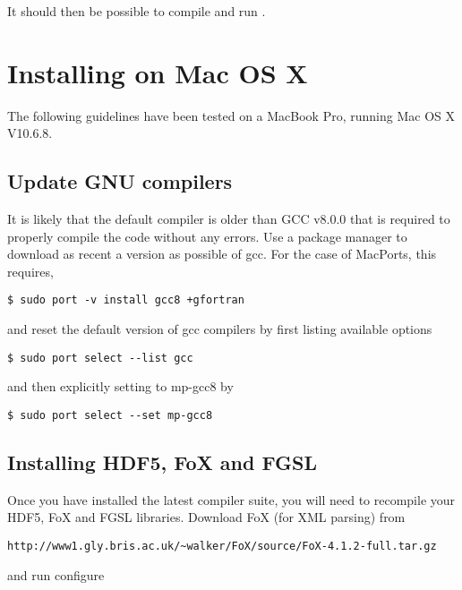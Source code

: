 It should then be possible to compile and run \glc.

\section{Installing on Mac OS X}

The following guidelines have been tested on a MacBook Pro, running Mac OS X V10.6.8. 

\subsection{Update GNU compilers}

It is likely that the default compiler is older than GCC v8.0.0 that is required to properly compile the code without any errors. Use a package manager to download as recent a version as possible of {\normalfont \ttfamily gcc}. For the case of MacPorts, this requires,

\begin{verbatim}
$ sudo port -v install gcc8 +gfortran
\end{verbatim}

and reset the default version of {\normalfont \ttfamily gcc} compilers by first listing available options

\begin{verbatim}
$ sudo port select --list gcc
\end{verbatim}

and then explicitly setting to {\normalfont \ttfamily mp-gcc8} by

\begin{verbatim}
$ sudo port select --set mp-gcc8
\end{verbatim}

\subsection{Installing HDF5, FoX and FGSL}

Once you have installed the latest compiler suite, you will need to recompile your {\normalfont \ttfamily HDF5}, {\normalfont \ttfamily FoX} and {\normalfont \ttfamily FGSL} libraries. Download {\normalfont \ttfamily FoX} (for XML parsing) from

\begin{verbatim}
http://www1.gly.bris.ac.uk/~walker/FoX/source/FoX-4.1.2-full.tar.gz
\end{verbatim}

and run {\normalfont \ttfamily configure}

